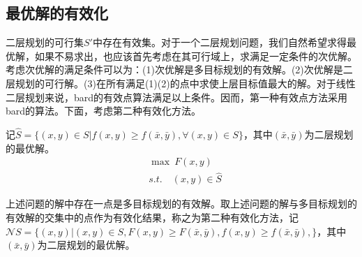     \subsection{最优解的有效化}
        \par
        二层规划的可行集$S'$中存在有效集。对于一个二层规划问题，我们自然希望求得最优解，如果不易求出，也应该首先考虑在其可行域上，求满足一定条件的次优解。考虑次优解的满足条件可以为：(1)次优解是多目标规划的有效解。(2)次优解是二层规划的可行解。(3)在所有满足(1)(2)的点中求使上层目标值最大的解。对于线性二层规划来说，bard的有效点算法满足以上条件。因而，第一种有效点方法采用bard的算法。下面，考虑第二种有效化方法。
        \par
        记$\hat{S}=\{(x,y)\in S|f(x,y)\geqslant f(\bar{x},\bar{y}),\forall (x,y)\in S\}$，其中$(\bar{x},\bar{y})$为二层规划的最优解。
            \begin{align*}
                &\mathop{\max}\   F(x,y)\\
                &s.t.\quad (x,y)\in \hat{S}
            \end{align*}
        \par
        上述问题的解中存在一点是多目标规划的有效解。取上述问题的解与多目标规划的有效解的交集中的点作为有效化结果，称之为第二种有效化方法，记$\mathcal{N}S=\{(x,y)|(x,y)\in S,F(x,y)\geqslant F(\bar{x},\bar{y}),f(x,y)\geqslant f(\bar{x},\bar{y}),\}$，其中$(\bar{x},\bar{y})$为二层规划的最优解。
